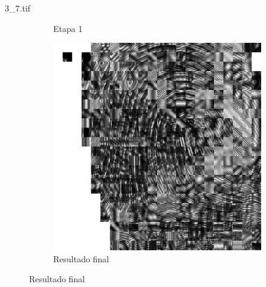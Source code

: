 \documentclass{beamer}
\begin{document}
\begin{frame}{3\_7.tif}
\begin{figure}
\begin{subfigure}[!ht]{0.32\textwidth}
                \caption{Etapa 1}
            \end{subfigure}
            \begin{subfigure}[!ht]{0.32\textwidth}
                \includegraphics[width=\columnwidth]{Fingerprints/3_7_final.jpg}
                \caption{Resultado final}
            \end{subfigure}
        \end{figure}
    \end{frame}
\end{document}

